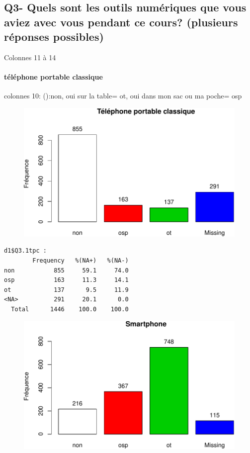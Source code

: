 \documentclass[]{article}
\begin{document}
\subsection{Q3- Quels sont les outils numériques que vous aviez avec
vous pendant ce cours? (plusieurs réponses
possibles)}\label{q3--quels-sont-les-outils-numeriques-que-vous-aviez-avec-vous-pendant-ce-cours-plusieurs-reponses-possibles}

Colonnes 11 à 14

\paragraph{téléphone portable
classique}\label{telephone-portable-classique}

colonnes 10: ():non, oui sur la table= ot, oui dans mon sac ou ma poche=
osp

\begin{figure}[htbp]
\centering
\includegraphics{qs_etudiants_files/figure-latex/outils-1.pdf}
\end{figure}

\begin{verbatim}
d1$Q3.1tpc : 
        Frequency   %(NA+)   %(NA-)
non           855     59.1     74.0
osp           163     11.3     14.1
ot            137      9.5     11.9
<NA>          291     20.1      0.0
  Total      1446    100.0    100.0
\end{verbatim}

\begin{figure}[htbp]
\centering
\includegraphics{qs_etudiants_files/figure-latex/outils-2.pdf}
\end{figure}
\end{document}
